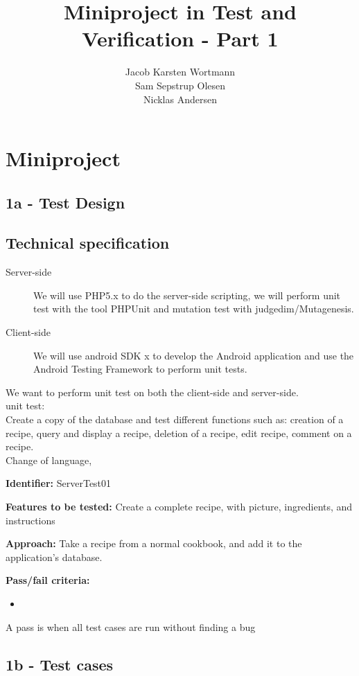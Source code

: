 \documentclass[a4paper,12pt]{memoir}
\title{Miniproject in Test and Verification - Part 1}
\author{Jacob Karsten Wortmann\\Sam Sepstrup Olesen\\Nicklas Andersen}
\newcommand{\testdesign}[4]
{
\begin{framed}
\begin{description}
\item \textbf{Identifier:} #1
\item \textbf{Features to be tested:} #2
\item \textbf{Approach:} #3
\item \textbf{Pass/fail criteria:} #4
\end{description}
\end{framed}
}
\begin{document}
\maketitle
\chapter*{Miniproject}
\section*{1a - Test Design}
\section{Technical specification}
\begin{description}
    \item[Server-side]
        We will use PHP5.x to do the server-side scripting,
        we will perform unit test with the tool PHPUnit and mutation test with judgedim/Mutagenesis.
    \item[Client-side]
        We will use android SDK x to develop the Android application and use the Android Testing Framework to perform unit tests.
\end{description}

We want to perform unit test on both the client-side and server-side.\\
unit test:\\
Create a copy of the database and test different functions such as: creation of a recipe, query and display a recipe, deletion of a recipe, edit recipe, comment on a recipe.\\
Change of language, 


\testdesign
{ServerTest01}
{Create a complete recipe, with picture, ingredients, and instructions}
{Take a recipe from a normal cookbook, and add it to the application's database.}
{\begin{itemize}[nolistsep]
\item
\end{itemize}}
{A pass is when all test cases are run without finding a bug}




\section*{1b - Test cases}
\end{document}
